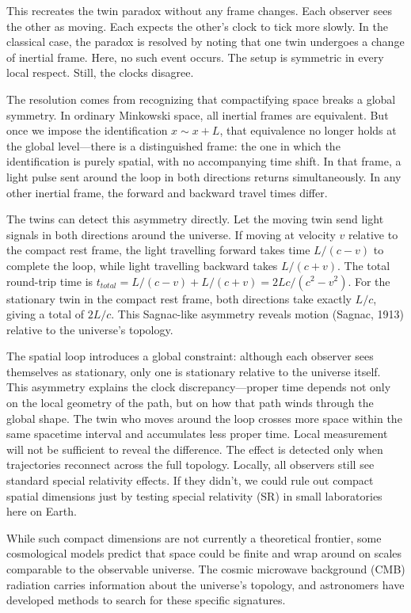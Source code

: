 This recreates the twin paradox without any frame changes. Each observer sees the other as moving. Each expects the other's clock to tick more slowly. In the classical case, the paradox is resolved by noting that one twin undergoes a change of inertial frame. Here, no such event occurs. The setup is symmetric in every local respect. Still, the clocks disagree.

The resolution comes from recognizing that compactifying space breaks a global symmetry. In ordinary Minkowski space, all inertial frames are equivalent. But once we impose the identification $x \sim x + L$, that equivalence no longer holds at the global level—there is a distinguished frame: the one in which the identification is purely spatial, with no accompanying time shift. In that frame, a light pulse sent around the loop in both directions returns simultaneously. In any other inertial frame, the forward and backward travel times differ.

The twins can detect this asymmetry directly. Let the moving twin send light signals in both directions around the universe. If moving at velocity $v$ relative to the compact rest frame, the light travelling forward takes time $L/(c-v)$ to complete the loop, while light travelling backward takes $L/(c+v)$. The total round-trip time is $t_{total} = L/(c-v) + L/(c+v) = 2Lc/(c^2-v^2)$. For the stationary twin in the compact rest frame, both directions take exactly $L/c$, giving a total of $2L/c$. This Sagnac-like asymmetry reveals motion (Sagnac, 1913) relative to the universe's topology.

The spatial loop introduces a global constraint: although each observer sees themselves as stationary, only one is stationary relative to the universe itself. This asymmetry explains the clock discrepancy—proper time depends not only on the local geometry of the path, but on how that path winds through the global shape. The twin who moves around the loop crosses more space within the same spacetime interval and accumulates less proper time. Local measurement will not be sufficient to reveal the difference. The effect is detected only when trajectories reconnect across the full topology. Locally, all observers still see standard special relativity effects. If they didn't, we could rule out compact spatial dimensions just by testing special relativity (SR) in small laboratories here on Earth.

While such compact dimensions are not currently a theoretical frontier, some cosmological models predict that space could be finite and wrap around on scales comparable to the observable universe. The cosmic microwave background (CMB) radiation carries information about the universe's topology, and astronomers have developed methods to search for these specific signatures.

